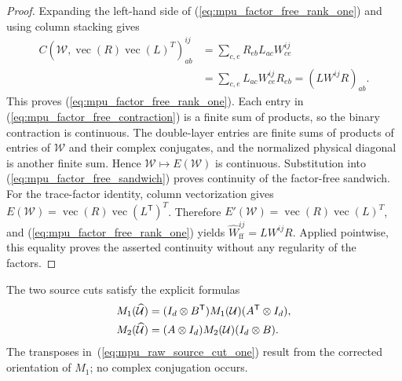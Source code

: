 \begin{proof}\leanok
    Expanding the left-hand side of
    (\ref{eq:mpu_factor_free_rank_one}) and using column stacking gives
    \begin{align}
        C\!\left(\mathcal W,
        \operatorname{vec}(R)\operatorname{vec}(L)^T\right)^{ij}_{ab}
         & =\sum_{c,e}R_{eb}L_{ac}W^{ij}_{ce} \\
         & =\sum_{c,e}L_{ac}W^{ij}_{ce}R_{eb}
        =(L W^{ij}R)_{ab}.
    \end{align}
    This proves (\ref{eq:mpu_factor_free_rank_one}). Each entry in
    (\ref{eq:mpu_factor_free_contraction}) is a finite sum of products, so the
    binary contraction is continuous. The double-layer entries are finite sums
    of products of entries of $\mathcal W$ and their complex conjugates, and the
    normalized physical diagonal is another finite sum. Hence
    $\mathcal W\mapsto E(\mathcal W)$ is continuous. Substitution into
    (\ref{eq:mpu_factor_free_sandwich}) proves continuity of the factor-free
    sandwich. For the trace-factor identity, column vectorization gives
    $E(\mathcal W)=\operatorname{vec}(R)\operatorname{vec}(L^{\mathsf T})^T$.
    Therefore $E'(\mathcal W)=\operatorname{vec}(R)\operatorname{vec}(L)^T$,
    and
    (\ref{eq:mpu_factor_free_rank_one}) yields
    $\widehat W_{\mathrm{ff}}^{ij}=LW^{ij}R$. Applied pointwise, this equality
    proves the asserted continuity without any regularity of the factors.
\end{proof}

\begin{lemma}
    \label{thm:mpu_virtual_sandwich_source_cuts}
    \leanok
    The two source cuts satisfy the explicit formulas
    \begin{align}
        M_1(\widehat{\mathcal U})
         & =(I_d\otimes B^{\mathsf T})M_1(\mathcal U)
        (A^{\mathsf T}\otimes I_d),
        \label{eq:mpu_raw_source_cut_one}                \\
        M_2(\widehat{\mathcal U})
         & =(A\otimes I_d)M_2(\mathcal U)(I_d\otimes B).
        \notag
    \end{align}
    The transposes in~(\ref{eq:mpu_raw_source_cut_one}) result from the corrected orientation
    of $M_1$; no complex conjugation occurs.
\end{lemma}

